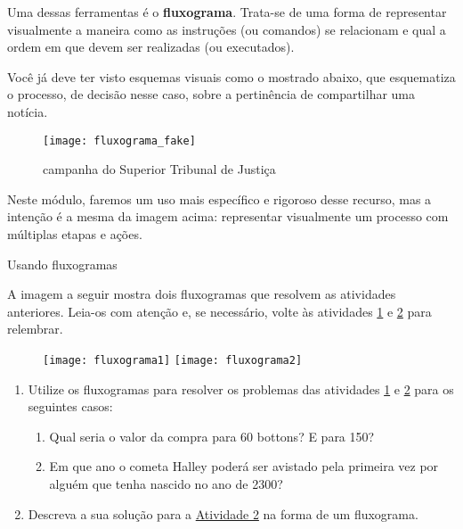 Uma dessas ferramentas é o \textbf{fluxograma}. Trata-se de uma forma de representar visualmente a maneira como as instruções (ou comandos) se relacionam e qual a ordem em que devem ser realizadas (ou executados).

Você já deve ter visto esquemas visuais como o mostrado abaixo, que esquematiza o processo, de decisão nesse caso, sobre a pertinência de compartilhar uma notícia.

\begin{figure}[H]
\centering

\texttt{[image: fluxograma\_fake]}
\caption{campanha do Superior Tribunal de Justiça}

\end{figure}

Neste módulo, faremos um uso mais específico e rigoroso desse recurso, mas a intenção é a mesma da imagem acima: representar visualmente um processo com múltiplas etapas e ações.

\clearpage
\begin{task}{Usando fluxogramas}
\label{comp-task3}

A imagem a seguir mostra dois fluxogramas que resolvem as atividades anteriores. Leia-os com atenção e, se necessário, volte às atividades \hyperref[comp-task1]{1} e \hyperref[comp-task2]{2} para relembrar.

\begin{figure}[H]
\centering

\texttt{[image: fluxograma1]}
\hspace{1em}
\texttt{[image: fluxograma2]}
\end{figure}

\begin{enumerate}
\item Utilize os fluxogramas para resolver os problemas das atividades \hyperref[comp-task1]{1} e \hyperref[comp-task2]{2} para os seguintes casos:

\begin{enumerate}
\item Qual seria o valor da compra para 60 bottons? E para 150?

\item Em que ano o cometa Halley poderá ser avistado pela primeira vez por alguém que tenha nascido no ano de 2300?
\end{enumerate}

\item Descreva a sua solução para a \hyperref[comp-task2]{Atividade 2} na forma de um fluxograma.
\end{enumerate}

\end{task}


